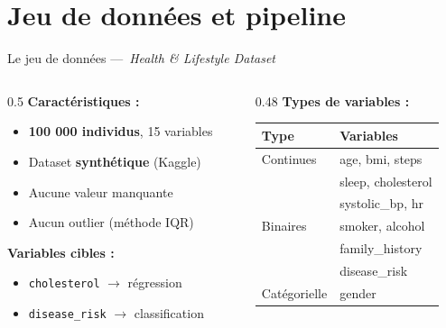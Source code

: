 \documentclass[12pt]{beamer}
\begin{document}
\section{Jeu de données et pipeline}

\begin{frame}{Le jeu de données ---~\textit{Health \& Lifestyle Dataset}}

\begin{columns}[T]
\begin{column}{0.5\textwidth}
\textbf{Caractéristiques :}
\begin{itemize}
  \item \textbf{100 000 individus}, 15 variables
  \item Dataset \textbf{synthétique} (Kaggle)
  \item Aucune valeur manquante
  \item Aucun outlier (méthode IQR)
\end{itemize}

\bigskip

\textbf{Variables cibles :}
\begin{itemize}
  \item \texttt{cholesterol} $\rightarrow$ régression
  \item \texttt{disease\_risk} $\rightarrow$ classification
\end{itemize}
\end{column}

\begin{column}{0.48\textwidth}
\textbf{Types de variables :}

\smallskip
\begin{tabular}{ll}
\toprule
Type & Variables \\
\midrule
Continues & age, bmi, steps \\
            & sleep, cholesterol \\
            & systolic\_bp, hr \\
Binaires    & smoker, alcohol \\
            & family\_history \\
            & disease\_risk \\
Catégorielle & gender \\
\bottomrule
\end{tabular}
\end{column}
\end{columns}

\end{frame}
\end{document}
